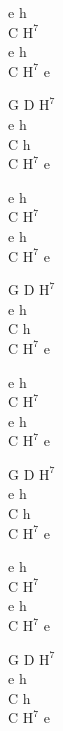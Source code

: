 \begin{chord}
    e h\\
    C $\mathrm{H^7}$\\
    e h\\
    C $\mathrm{H^7}$ e

    G D $\mathrm{H^7}$\\
    e h\\
    C h\\
    C $\mathrm{H^7}$ e

    e h\\
    C $\mathrm{H^7}$\\
    e h\\
    C $\mathrm{H^7}$ e

    G D $\mathrm{H^7}$\\
    e h\\
    C h\\
    C $\mathrm{H^7}$ e

    e h\\
    C $\mathrm{H^7}$\\
    e h\\
    C $\mathrm{H^7}$ e

    G D $\mathrm{H^7}$\\
    e h\\
    C h\\
    C $\mathrm{H^7}$ e

    e h\\
    C $\mathrm{H^7}$\\
    e h\\
    C $\mathrm{H^7}$ e

    G D $\mathrm{H^7}$\\
    e h\\
    C h\\
    C $\mathrm{H^7}$ e
\end{chord}
